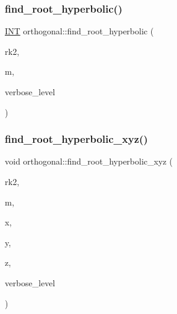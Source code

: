 \mbox{\label{classorthogonal_a4cb66d7aec283cd032a99cb9b2b9992d}} 
\subsubsection{\texorpdfstring{find\+\_\+root\+\_\+hyperbolic()}{find\_root\_hyperbolic()}}
{\footnotesize\ttfamily \mbox{\hyperlink{galois_8h_a09fddde158a3a20bd2dcadb609de11dc}{I\+NT}} orthogonal\+::find\+\_\+root\+\_\+hyperbolic (\begin{DoxyParamCaption}\item[{\mbox{\hyperlink{galois_8h_a09fddde158a3a20bd2dcadb609de11dc}{I\+NT}}}]{rk2,  }\item[{\mbox{\hyperlink{galois_8h_a09fddde158a3a20bd2dcadb609de11dc}{I\+NT}}}]{m,  }\item[{\mbox{\hyperlink{galois_8h_a09fddde158a3a20bd2dcadb609de11dc}{I\+NT}}}]{verbose\+\_\+level }\end{DoxyParamCaption})}

\mbox{\label{classorthogonal_ab9f510771aeba6130e8147ca161b23fc}} 
\subsubsection{\texorpdfstring{find\+\_\+root\+\_\+hyperbolic\+\_\+xyz()}{find\_root\_hyperbolic\_xyz()}}
{\footnotesize\ttfamily void orthogonal\+::find\+\_\+root\+\_\+hyperbolic\+\_\+xyz (\begin{DoxyParamCaption}\item[{\mbox{\hyperlink{galois_8h_a09fddde158a3a20bd2dcadb609de11dc}{I\+NT}}}]{rk2,  }\item[{\mbox{\hyperlink{galois_8h_a09fddde158a3a20bd2dcadb609de11dc}{I\+NT}}}]{m,  }\item[{\mbox{\hyperlink{galois_8h_a09fddde158a3a20bd2dcadb609de11dc}{I\+NT}} $\ast$}]{x,  }\item[{\mbox{\hyperlink{galois_8h_a09fddde158a3a20bd2dcadb609de11dc}{I\+NT}} $\ast$}]{y,  }\item[{\mbox{\hyperlink{galois_8h_a09fddde158a3a20bd2dcadb609de11dc}{I\+NT}} $\ast$}]{z,  }\item[{\mbox{\hyperlink{galois_8h_a09fddde158a3a20bd2dcadb609de11dc}{I\+NT}}}]{verbose\+\_\+level }\end{DoxyParamCaption})}

